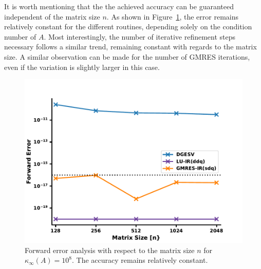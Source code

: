 It is worth mentioning that the the achieved accuracy can be guaranteed independent of the matrix size $n$. As shown in Figure~\hyperref[fig:ir3_n]{\ref{fig:ir3_n}}, the error remains relatively constant for the different routines, depending solely on the condition number of $A$. Most interestingly, the number of iterative refinement steps necessary follows a similar trend, remaining constant with regards to the matrix size. A similar observation can be made for the number of GMRES iterations, even if the variation is slightly larger in this case.

\begin{figure}[h]
    \centering
    \includegraphics[width=0.9\linewidth]{chapters/5_experiments/figures/IR3_n.pdf}
    \caption[IR - Forward Error 2]{Forward error analysis with respect to the matrix size $n$ for $\kappa_\infty(A)=10^8$. The accuracy remains relatively constant.}
    \label{fig:ir3_n}
\end{figure}